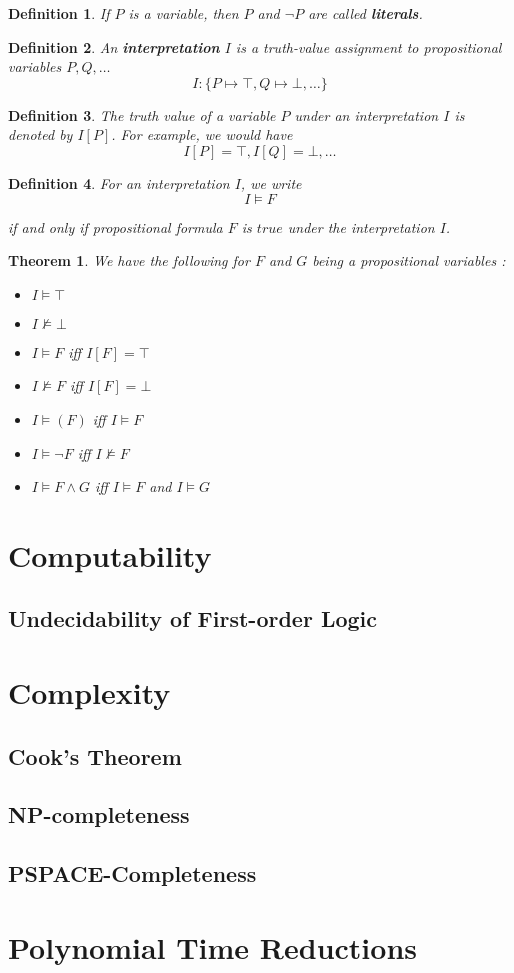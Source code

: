 \documentclass[a4paper,11pt]{report}
\newtheorem*{mydef}{Definition}
\newtheorem{theorem}{Theorem}
\begin{document}
\begin{mydef}
  If $P$ is a variable, then $P$ and $\neg P$ are called \textbf{literals}.
\end{mydef}

\begin{mydef}
  An \textbf{interpretation} $I$ is a truth-value assignment to propositional
  variables $P,Q,\dots$
  \[
    I : \{ P \mapsto \top, Q \mapsto \bot, \dots\}
  \]
\end{mydef}

\begin{mydef}
  The truth value of a variable $P$ under an interpretation $I$ is denoted by
  $I[P]$. For example, we would have
  \[
    I[P] = \top, I[Q] = \bot, \dots
  \]
\end{mydef}

\begin{mydef}
  For an interpretation $I$, we write
  \[
    I \models F
  \]

  if and only if propositional formula $F$ is $true$ under the interpretation
  $I$.
\end{mydef}

\begin{theorem}
  We have the following for $F$ and $G$ being a propositional variables :
  \begin{itemize}
  \item $I \models \top$
  \item $I \not\models \bot$
  \item $ I \models F$ iff $I[F] = \top$
  \item $ I \not\models F$ iff $I[F] = \bot$
  \item $ I \models (F)$ iff $I \models F$
  \item $ I \models \neg F$ iff $I \not\models F$
  \item $ I \models F \wedge G $ iff $I \models F$ and $I \models G$
  \end{itemize}
\end{theorem}



\chapter{Computability}
\section{Undecidability of First-order Logic}
\chapter{Complexity}
\section{Cook's Theorem}
\section{NP-completeness}
\section{PSPACE-Completeness}
\chapter{Polynomial Time Reductions}
\end{document}
